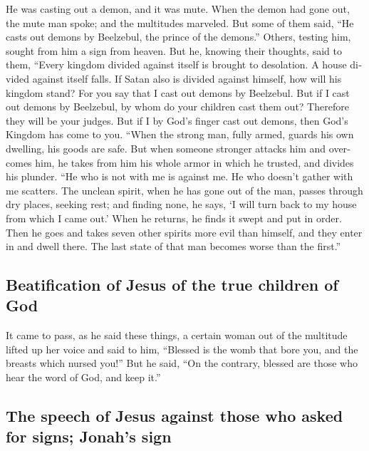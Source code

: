 \begin{paracol}{2}
\begin{otherlanguage}{english}
 He was casting out a demon, and it was mute. When the
demon had gone out, the mute man spoke; and the multitudes marveled.
 But some of them said, ``He casts out demons by
Beelzebul, the prince of the demons.''  Others, testing
him, sought from him a sign from heaven.  But he, knowing
their thoughts, said to them, ``Every kingdom divided against itself is
brought to desolation. A house divided against itself falls.
 If Satan also is divided against himself, how will his
kingdom stand? For you say that I cast out demons by Beelzebul.
 But if I cast out demons by Beelzebul, by whom do your
children cast them out? Therefore they will be your judges.
 But if I by God's finger cast out demons, then God's
Kingdom has come to you.  ``When the strong man, fully
armed, guards his own dwelling, his goods are safe.  But
when someone stronger attacks him and overcomes him, he takes from him
his whole armor in which he trusted, and divides his plunder.
 ``He who is not with me is against me. He who doesn't
gather with me scatters.  The unclean spirit, when he has
gone out of the man, passes through dry places, seeking rest; and
finding none, he says, `I will turn back to my house from which I came
out.'  When he returns, he finds it swept and put in
order.  Then he goes and takes seven other spirits more
evil than himself, and they enter in and dwell there. The last state of
that man becomes worse than the first.''

\hypertarget{beatification-of-jesus-of-the-true-children-of-god}{%
\subsection{Beatification of Jesus of the true children of
God}\label{beatification-of-jesus-of-the-true-children-of-god}}

 It came to pass, as he said these things, a certain
woman out of the multitude lifted up her voice and said to him,
``Blessed is the womb that bore you, and the breasts which nursed you!''
 But he said, ``On the contrary, blessed are those who
hear the word of God, and keep it.''

\hypertarget{the-speech-of-jesus-against-those-who-asked-for-signs-jonahs-sign}{%
\subsection{The speech of Jesus against those who asked for signs;
Jonah's
sign}\label{the-speech-of-jesus-against-those-who-asked-for-signs-jonahs-sign}}


\end{otherlanguage}
\end{paracol}
